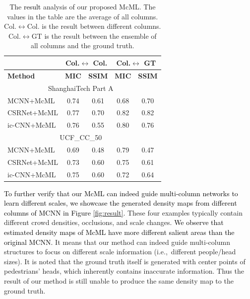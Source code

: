 \documentclass[sigconf]{acmart}
\newcommand{\czq}[1]{\textcolor{black}{#1}}
\begin{document}
\begin{table}[t]
\small
\caption{\small The \czq{result} analysis of our proposed McML.
The values in the table are the average of all columns.
Col.$\leftrightarrow$Col. is the result between different columns.
Col.$\leftrightarrow$GT is the result between the ensemble of all columns and the ground truth.}
\renewcommand\arraystretch{0.9}
\vspace{-2mm}
\begin{center}
\begin{tabular}{|l|c|c|c|c|} 
\hline
& \multicolumn{2}{c|}{\textbf{Col.$\leftrightarrow$ Col. }}      & \multicolumn{2}{c|}{\textbf{Col.$\leftrightarrow$ GT }}  \\ 
\hline
\textbf{Method }  & \textbf{MIC } & \textbf{SSIM}  & \textbf{MIC } & \textbf{SSIM}           \\ 
\hline\hline
\multicolumn{5}{|c|}{ShanghaiTech Part A~\cite{MCNN-16}}             \\ 
\hline
MCNN+McML     &  0.74   & 0.61   &   0.68  &     0.70  \\
CSRNet+McML    & 0.77   & 0.70   &  0.82   &   0.82    \\
ic-CNN+McML    &  0.76   & 0.55    &   0.80  &     0.76  \\ 
\hline\hline
\multicolumn{5}{|c|}{{UCF\_CC\_50}~\cite{r-mrf-count-multi-source-13}}             \\ 
\hline
MCNN+McML     &  0.69   &  0.48  &  0.79   & 0.47      \\
CSRNet+McML     &  0.73   & 0.60  &  0.75   &  0.61     \\
ic-CNN+McML    &  0.75   & 0.60  &  0.72   &   0.64    \\
\hline
\end{tabular}
\end{center}
\vspace{-2mm}
\label{tab:why}
\end{table}


\czq{To further verify that our McML can indeed guide multi-column networks to learn different scales, we showcase the generated density maps from different columns of MCNN in Figure \ref{fig:result}.}
These four examples typically contain different crowd densities, occlusions, and scale changes.
\czq{We observe that estimated density maps of McML have more different salient areas than the original MCNN.}
It means that our method can indeed guide multi-column structures to focus on different scale information (i.e.,~different people/head sizes).
It is noted that the ground truth itself is generated with center points of pedestrians' heads, which inherently contains inaccurate information. 
Thus the result of our method is still unable to produce the same density map to the ground truth.
\end{document}
